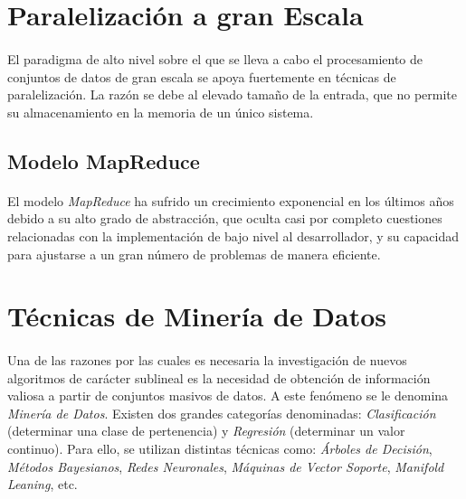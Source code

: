 \documentclass[a4paper]{article}
\begin{document}
  \section{Paralelización a gran Escala}

    \paragraph{}
    El paradigma de alto nivel sobre el que se lleva a cabo el procesamiento de conjuntos de datos de gran escala se apoya fuertemente en técnicas de paralelización. La razón se debe al elevado tamaño de la entrada, que no permite su almacenamiento en la memoria de un único sistema.

    \subsection{Modelo MapReduce}

      \paragraph{}
      El modelo \emph{MapReduce} ha sufrido un crecimiento exponencial en los últimos años debido a su alto grado de abstracción, que oculta casi por completo cuestiones relacionadas con la implementación de bajo nivel al desarrollador, y su capacidad para ajustarse a un gran número de problemas de manera eficiente.

  \section{Técnicas de Minería de Datos}

    \paragraph{}
    Una de las razones por las cuales es necesaria la investigación de nuevos algoritmos de carácter sublineal es la necesidad de obtención de información valiosa a partir de conjuntos masivos de datos. A este fenómeno se le denomina \emph{Minería de Datos}. Existen dos grandes categorías denominadas: \emph{Clasificación} (determinar una clase de pertenencia) y \emph{Regresión} (determinar un valor continuo). Para ello, se utilizan distintas técnicas como: \emph{Árboles de Decisión}, \emph{Métodos Bayesianos}, \emph{Redes Neuronales}, \emph{Máquinas de Vector Soporte}, \emph{Manifold Leaning}, etc.
\end{document}
